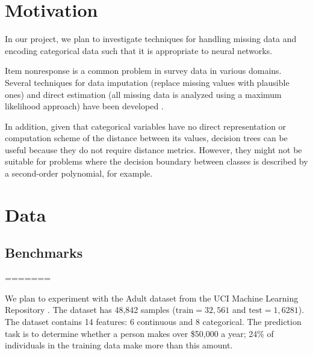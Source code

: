 \documentclass[12pt]{article}
\begin{document}
\maketitle

\section{Motivation}
In our project, we plan to investigate techniques for handling missing data and
encoding categorical data such that it is appropriate to neural networks.  



Item nonresponse is a common problem in survey data in various domains. Several
techniques for data imputation (replace missing values with plausible ones) and
direct estimation (all missing data is analyzed using a maximum likelihood
approach) have been developed \cite{de2003prevention}.


In addition, given that categorical variables have no direct representation or computation scheme of the distance between its values, decision trees can be useful because they do not require distance metrics. However, they might not be suitable for problems where the decision boundary between classes is described by a second-order polynomial, for example.\cite{fayyad1996data}

\section{Data}
\subsection{Benchmarks}
=======


We plan to experiment with the Adult dataset from the UCI Machine Learning Repository \citep{Lichman2013}. The dataset has 48,842 samples ($\mathrm{train}=32,561$ and $\mathrm{test}=1,6281$). The dataset contains 14 features: 6 continuous and 8 categorical. The prediction task is to determine whether a person makes over \$50,000 a year; 24\% of individuals in the training data make more than this amount. \\
\end{document}
